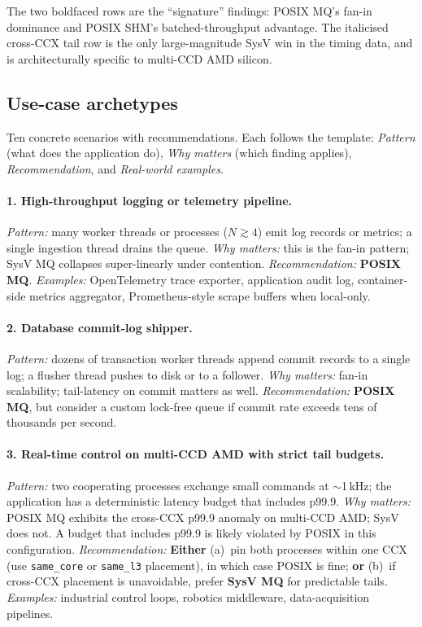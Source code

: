 \documentclass[a4paper,11pt]{article}
\begin{document}
The two boldfaced rows are the ``signature'' findings: POSIX MQ's
fan-in dominance and POSIX SHM's batched-throughput advantage. The
italicised cross-CCX tail row is the only large-magnitude SysV win
in the timing data, and is architecturally specific to multi-CCD
AMD silicon.

\subsection{Use-case archetypes}
\label{sec:guidance:usecase}

Ten concrete scenarios with recommendations. Each follows the
template:
\textit{Pattern} (what does the application do), \textit{Why
matters} (which finding applies), \textit{Recommendation}, and
\textit{Real-world examples}.

\paragraph{1. High-throughput logging or telemetry pipeline.}
\textit{Pattern:} many worker threads or processes ($N\gtrsim 4$)
emit log records or metrics; a single ingestion thread drains the
queue.\quad
\textit{Why matters:} this is the fan-in pattern; SysV MQ collapses
super-linearly under contention.\quad
\textit{Recommendation:} \textbf{POSIX MQ}.\quad
\textit{Examples:} OpenTelemetry trace exporter, application audit
log, container-side metrics aggregator, Prometheus-style scrape
buffers when local-only.

\paragraph{2. Database commit-log shipper.}
\textit{Pattern:} dozens of transaction worker threads append commit
records to a single log; a flusher thread pushes to disk or to a
follower.\quad
\textit{Why matters:} fan-in scalability; tail-latency on commit
matters as well.\quad
\textit{Recommendation:} \textbf{POSIX MQ}, but consider a custom
lock-free queue if commit rate exceeds tens of thousands per second.

\paragraph{3. Real-time control on multi-CCD AMD with strict tail
budgets.}
\textit{Pattern:} two cooperating processes exchange small commands
at $\sim$1\,kHz; the application has a deterministic latency budget
that includes p99.9.\quad
\textit{Why matters:} POSIX MQ exhibits the cross-CCX p99.9 anomaly
on multi-CCD AMD; SysV does not. A budget that includes p99.9 is
likely violated by POSIX in this configuration.\quad
\textit{Recommendation:} \textbf{Either} (a)~pin both processes
within one CCX (use \texttt{same\_core} or \texttt{same\_l3}
placement), in which case POSIX is fine; \textbf{or} (b)~if cross-CCX
placement is unavoidable, prefer \textbf{SysV MQ} for predictable
tails.\quad
\textit{Examples:} industrial control loops, robotics middleware,
data-acquisition pipelines.
\end{document}
